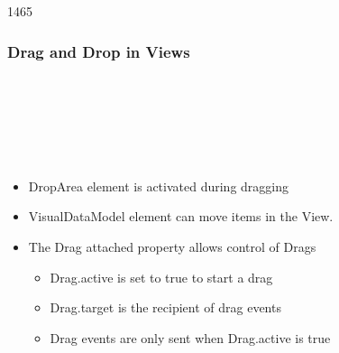 \begin{slide}{1465}\frametitle{Drag and Drop in Views}

\begin{qml}
\\
\\
\\
\\
\qtt{~~~~\}}\\
\qtt{\}}
\end{qml}

\begin{itemize}
\item DropArea element is activated during dragging
\item VisualDataModel element can move items in the View.
\item The Drag attached property allows control of Drags
  \begin{itemize}
    \item Drag.active is set to true to start a drag
    \item Drag.target is the recipient of drag events
    \item Drag events are only sent when Drag.active is true
  \end{itemize}
\end{itemize}

\begin{qml}
\\
\\
\qtt{\}}
\end{qml}


\end{slide}
